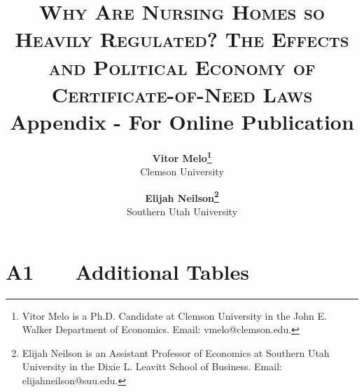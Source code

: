 \documentclass[12pt]{article}
\renewcommand*\thetable{\arabic{table}}
\begin{document}

\title{\textsc{Why Are Nursing Homes so Heavily Regulated? The Effects and Political Economy of Certificate-of-Need Laws}\\
	$~$\\
	$~$\\
	Appendix - For Online Publication
	$~$\\
    $~$\\}



\author{\textbf{Vitor Melo\protect\thanks{Vitor Melo is a Ph.D. Candidate at Clemson University in the John E. Walker Department of Economics. Email: vmelo@clemson.edu.}} \\ Clemson University
\and
\textbf{Elijah Neilson\protect\thanks{Elijah Neilson is an Assistant Professor of Economics at Southern Utah University in the Dixie L. Leavitt School of Business. Email: elijahneilson@suu.edu.}} \\ Southern Utah University
  	}		

\date{}              %





\renewcommand{\thefootnote}{\fnsymbol{footnote}}

\singlespacing

\maketitle

\medskip


\clearpage

\onehalfspacing
\setcounter{footnote}{0}
\renewcommand{\thefootnote}{\arabic{footnote}}



\section*{A1 \ \ \ Additional Tables}
\vspace{.5cm}

\setcounter{table}{0}
\renewcommand{\thetable}{A\arabic{table}}
\end{document}

